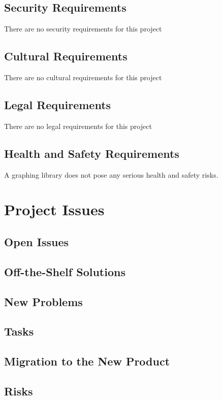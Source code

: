 \documentclass[12pt, titlepage]{article}
\begin{document}
\subsection{Security Requirements}
There are no security requirements for this project
\subsection{Cultural Requirements}
There are no cultural requirements for this project
\subsection{Legal Requirements}
There are no legal requirements for this project
\subsection{Health and Safety Requirements} %

A graphing library does not pose any serious health and safety risks.

\section{Project Issues}

\subsection{Open Issues}

\subsection{Off-the-Shelf Solutions}

\subsection{New Problems}

\subsection{Tasks} 

\subsection{Migration to the New Product}

\subsection{Risks}
\end{document}
